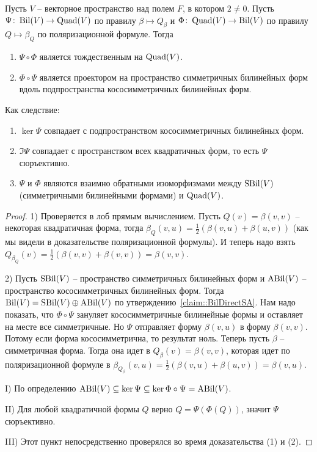 \begin{claim}
\label{claim::SBilQuad}
Пусть $V$ -- векторное пространство над полем $F$, в котором $2 \neq 0$.
Пусть $\Psi\colon \operatorname{Bil}(V) \to \operatorname{Quad}(V)$ по правилу $\beta\mapsto Q_\beta$ и $\Phi\colon \operatorname{Quad}(V)\to \operatorname{Bil}(V)$ по правилу $Q \mapsto \beta_Q$ по поляризационной формуле.
Тогда
\begin{enumerate}
\item $\Psi\circ \Phi$ является тождественным на $\operatorname{Quad}(V)$.

\item $\Phi\circ \Psi$ является проектором на пространство симметричных билинейных форм вдоль подпространства кососимметричных билинейных форм.
\end{enumerate}

Как следствие:
\begin{enumerate}
[\rm I.]
\item $\ker \Psi$ совпадает с подпространством кососимметричных билинейных форм.

\item $\Im \Psi$ совпадает с пространством всех квадратичных форм, то есть $\Psi$ сюръективно.

\item $\Psi$ и $\Phi$ являются взаимно обратными изоморфизмами между $\operatorname{SBil}(V)$ (симметричными билинейными формами) и $\operatorname{Quad}(V)$.
\end{enumerate}
\end{claim}
\begin{proof}
1) Проверяется в лоб прямым вычислением.
Пусть $Q(v) = \beta(v,v)$ -- некоторая квадратичная форма, тогда $\beta_Q(v,u) = \frac{1}{2}(\beta(v,u) + \beta(u,v))$ (как мы видели в доказательстве поляризационной формулы).
И теперь надо взять $Q_{\beta_Q}(v) =  \frac{1}{2}(\beta(v,v) + \beta(v,v)) = \beta(v,v)$.

2) Пусть $\operatorname{SBil}(V)$ -- пространство симметричных билинейных форм и $\operatorname{ABil}(V)$ -- пространство кососимметричных билинейных форм.
Тогда $\operatorname{Bil}(V) = \operatorname{SBil}(V) \oplus \operatorname{ABil}(V)$ по утверждению~\ref{claim::BilDirectSA}.
Нам надо показать, что $\Phi\circ \Psi$ зануляет кососимметричные билинейные формы и оставляет на месте все симметричные.
Но $\Psi$ отправляет форму $\beta(v, u)$ в форму $\beta(v,v)$.
Потому если форма кососимметрична, то результат ноль.
Теперь пусть $\beta$ -- симметричная форма.
Тогда она идет в $Q_\beta(v) = \beta(v,v)$, которая идет по поляризационной формуле в $\beta_{Q_\beta}(v, u)= \frac{1}{2}(\beta(v,u) + \beta(u,v)) = \beta(v,u)$.

I) По определению $\operatorname{ABil}(V) \subseteq \ker \Psi \subseteq \ker \Phi\circ \Psi = \operatorname{ABil}(V)$.

II) Для любой квадратичной формы $Q$ верно $Q = \Psi(\Phi(Q))$, значит $\Psi$ сюръективно.

III) Этот пункт непосредственно проверялся во время доказательства (1) и (2).
\end{proof}

